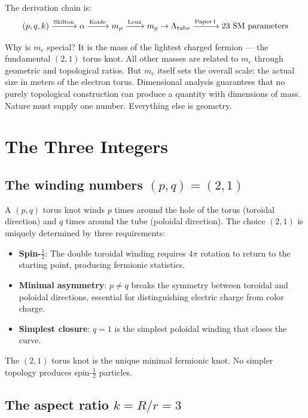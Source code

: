 \documentclass[11pt,a4paper]{article}
\begin{document}
The derivation chain is:
\begin{equation}
  (p, q, k) \xrightarrow{\text{Skilton}} \alpha \xrightarrow{\text{Koide}} m_\mu \xrightarrow{\text{Lenz}} m_p \to \Lambda_{\text{tube}} \xrightarrow{\text{Paper\,1}} \text{23 SM parameters}
  \label{eq:chain}
\end{equation}

Why is $m_e$ special? It is the mass of the lightest charged fermion --- the fundamental $(2,1)$ torus knot. All other masses are related to $m_e$ through geometric and topological ratios. But $m_e$ itself sets the overall scale: the actual size in meters of the electron torus. Dimensional analysis guarantees that no purely topological construction can produce a quantity with dimensions of mass. Nature must supply one number. Everything else is geometry.

\section{The Three Integers}
\label{sec:integers}

\subsection{The winding numbers $(p, q) = (2, 1)$}

A $(p,q)$ torus knot winds $p$ times around the hole of the torus (toroidal direction) and $q$ times around the tube (poloidal direction). The choice $(2, 1)$ is uniquely determined by three requirements:
\begin{itemize}
  \item \textbf{Spin-$\tfrac{1}{2}$}: The double toroidal winding requires $4\pi$ rotation to return to the starting point, producing fermionic statistics.
  \item \textbf{Minimal asymmetry}: $p \neq q$ breaks the symmetry between toroidal and poloidal directions, essential for distinguishing electric charge from color charge.
  \item \textbf{Simplest closure}: $q = 1$ is the simplest poloidal winding that closes the curve.
\end{itemize}

The $(2,1)$ torus knot is the unique minimal fermionic knot. No simpler topology produces spin-$\tfrac{1}{2}$ particles.

\subsection{The aspect ratio $k = R/r = 3$}
\end{document}
